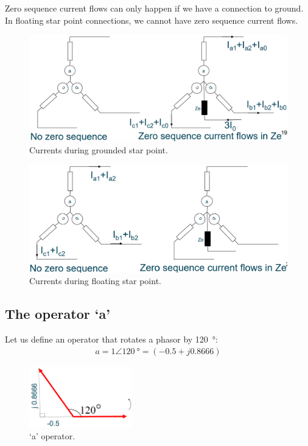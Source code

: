Zero sequence current flows can only happen if we have a connection to ground. In floating star point connections, we cannot have zero sequence current flows.
\begin{figure}[H]
	\centering
	\includegraphics[width = \textwidth]{./img/figure25.png}
	\caption{Currents during grounded star point.}
\end{figure}
\begin{figure}[H]
	\centering
	\includegraphics[width = \textwidth]{./img/figure26.png}
	\caption{Currents during floating star point.}
\end{figure}
\subsection{The operator `a'}
Let us define an operator that rotates a phasor by \SI{120}{\degree}:
\begin{gather}
	a = 1\angle \SI{120}{\degree} = (-0.5 + j 0.8666)
\end{gather}
\begin{figure}[H]
	\centering
	\includegraphics[width = 0.4\textwidth]{./img/figure27.png}
	\caption{`a' operator.}
\end{figure}
